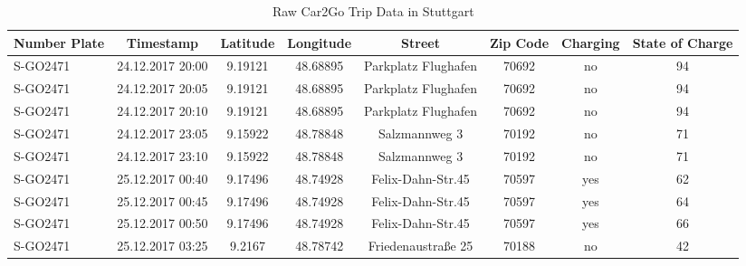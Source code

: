 \begin{sidewaystable}[htbp]
    \caption{Raw Car2Go Trip Data in Stuttgart \label{data-car2go-raw}}
    \centering
    \begin{tabular}{l|ccccccc}
      \hline
      \hline
      Number Plate & Timestamp & Latitude & Longitude & Street & Zip Code & Charging & State of Charge\\
      \hline
      S-GO2471 & 24.12.2017 20:00 & 9.19121 & 48.68895 & Parkplatz Flughafen & 70692 & no & 94\\
      S-GO2471 & 24.12.2017 20:05 & 9.19121 & 48.68895 & Parkplatz Flughafen & 70692 & no & 94\\
      S-GO2471 & 24.12.2017 20:10 & 9.19121 & 48.68895 & Parkplatz Flughafen & 70692 & no & 94\\
      S-GO2471 & 24.12.2017 23:05 & 9.15922 & 48.78848 & Salzmannweg 3 & 70192 & no & 71\\
      S-GO2471 & 24.12.2017 23:10 & 9.15922 & 48.78848 & Salzmannweg 3 & 70192 & no & 71\\
      S-GO2471 & 25.12.2017 00:40 & 9.17496 & 48.74928 & Felix-Dahn-Str.45 & 70597 & yes & 62\\
      S-GO2471 & 25.12.2017 00:45 & 9.17496 & 48.74928 & Felix-Dahn-Str.45 & 70597 & yes & 64\\
      S-GO2471 & 25.12.2017 00:50 & 9.17496 & 48.74928 & Felix-Dahn-Str.45 & 70597 & yes & 66\\
      S-GO2471 & 25.12.2017 03:25 & 9.2167 & 48.78742 & Friedenaustraße 25 & 70188 & no & 42\\
      \hline
      \hline
    \end{tabular}

    \bigskip\bigskip  %


\end{sidewaystable}
